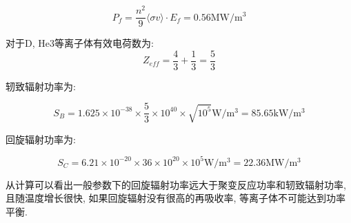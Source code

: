 \documentclass{article}
\begin{document}
$$P_f = \frac{n^2}{9} \langle \sigma v \rangle \cdot E_f = 0.56 \text{MW}/\text{m}^3$$

对于D, He3等离子体有效电荷数为: $$Z_{eff} = \frac{4}{3} + \frac{1}{3} = \frac{5}{3}$$

轫致辐射功率为:

$$S_B = 1.625 \times 10^{-38} \times \frac{5}{3} \times 10^{40} \times \sqrt{10^5}\text{W}/\text{m}^3 = 85.65 \text{kW}/\text{m}^3$$

回旋辐射功率为:

$$S_C = 6.21 \times 10^{-20} \times 36 \times 10^{20} \times 10^5\text{W}/\text{m}^3 = 22.36 \text{MW}/\text{m}^3$$

从计算可以看出一般参数下的回旋辐射功率远大于聚变反应功率和轫致辐射功率, 且随温度增长很快, 如果回旋辐射没有很高的再吸收率, 等离子体不可能达到功率平衡.
\end{document}
